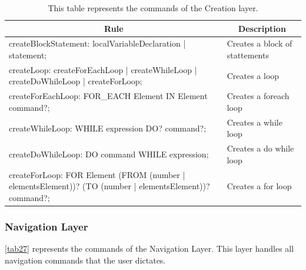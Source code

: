 \begin{table}[H]
	\centering
	\begin{tabular}{|p{8cm}|p{7cm}|}
		\hline
		\multicolumn{1}{|c|}{{\bf Rule}} & \multicolumn{1}{c|}{{\bf Description}} \\ \hline
		createBlockStatement: localVariableDeclaration | statement;                                                                                             & Creates a block of stattements         \\ \hline
		createLoop: createForEachLoop | createWhileLoop | createDoWhileLoop | createForLoop;                                                                    & Creates a loop                         \\ \hline
		createForEachLoop: FOR\_EACH Element IN Element command?;                                                                                               & Creates a foreach loop                 \\ \hline
		createWhileLoop: WHILE expression DO? command?;                                                                                                         & Creates a while loop                   \\ \hline
		createDoWhileLoop: DO command WHILE expression;                                                                                                         & Creates a do while loop                \\ \hline
		createForLoop: FOR Element (FROM (number | elementsElement))? (TO (number | elementsElement))? command?;                                                & Creates a for loop                     \\ \hline
	\end{tabular}
	\caption{This table represents the commands of the Creation layer.}
	\label{tab26}
\end{table}

\subsubsection{Navigation Layer}
\autoref{tab27} represents the commands of the Navigation Layer.  This layer handles all navigation commands that the user dictates.


